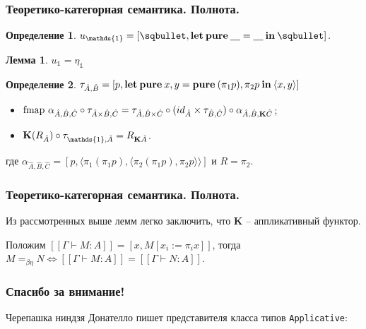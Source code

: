 \documentclass[10pt,pdf,utf8,russian,aspectratio=169]{beamer}
\newtheorem{defin}{Определение}
\newtheorem{lem}{Лемма}
\begin{document}
\begin{frame}
  \frametitle{Теоретико-категорная семантика. Полнота.}

  \begin{defin}
    $u_{\mathds{1}} = [\sqbullet, {\bf let \: pure \:} \underline{\quad} = \underline{\quad} {\: \bf in \:} \sqbullet]$.
  \end{defin}

  \begin{lem}
    $u_{\mathds{1}} = \eta_{\mathds{1}}$
  \end{lem}

  \begin{defin}
    $\tau_{\hat{A}, \hat{B}} = [p, {\bf let \: pure \:} x, y = {\bf pure \:} (\pi_1 p), \pi_2 p {\: \bf in \:} \langle x, y \rangle]$
  \end{defin}

  \begin{lemma}
    \begin{itemize}
      \item $\text{fmap } \alpha_{\hat{A},\hat{B},\hat{C}} \circ \tau_{\hat{A} \times \hat{B}, \hat{C}} = \tau_{\hat{A}, \hat{B} \times \hat{C}} \circ (id_{\hat{A}} \times \tau_{\hat{B}, \hat{C}}) \circ \alpha_{\hat{A}, \hat{B}, {\bf K}\hat{C}}$;
      \item ${\bf K}(R_{\hat{A}}) \circ \tau_{\mathds{1}, \hat{A}} = R_{{\bf K}\hat{A}}$.
    \end{itemize}
    где $\alpha_{\hat{A},\hat{B},\hat{C}} = [p, \langle \pi_1 (\pi_1 p), \langle \pi_2 (\pi_1 p), \pi_2 p \rangle \rangle]$ и
    $R = \pi_2$.
  \end{lemma}

\end{frame}

\begin{frame}
  \frametitle{Теоретико-категорная семантика. Полнота.}

  Из рассмотренных выше лемм легко заключить, что {\bf K} -- аппликативный функтор.

  Положим $[\![\Gamma \vdash M : A]\!] = [x, M [x_i := \pi_i x]]$, тогда $M =_{\beta \eta} N \Leftrightarrow [\![\Gamma \vdash M : A]\!] = [\![\Gamma \vdash N : A]\!]$.

\end{frame}

\begin{frame}
  \frametitle{Спасибо за внимание!}

  Черепашка ниндзя Донателло пишет представителя класса типов \verb"Applicative":


\end{frame}
\end{document}
